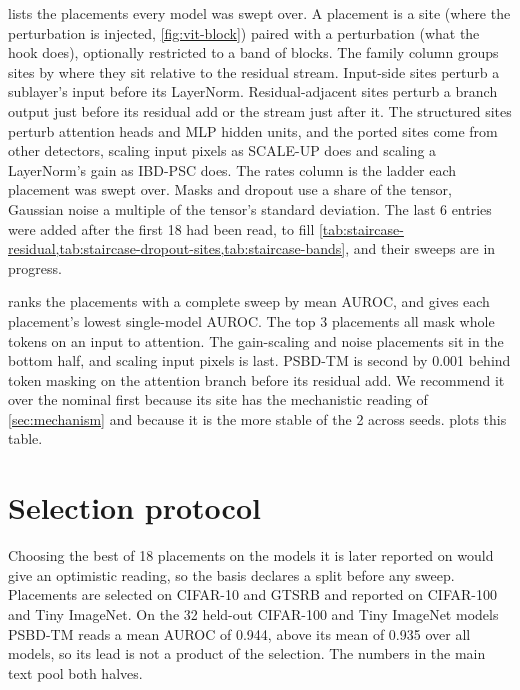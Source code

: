  lists the placements every model was swept over. A placement is a site (where the perturbation is injected, \cref{fig:vit-block}) paired with a perturbation (what the hook does), optionally restricted to a band of blocks. The family column groups sites by where they sit relative to the residual stream. Input-side sites perturb a sublayer's input before its LayerNorm. Residual-adjacent sites perturb a branch output just before its residual add or the stream just after it. The structured sites perturb attention heads and MLP hidden units, and the ported sites come from other detectors, scaling input pixels as SCALE-UP does and scaling a LayerNorm's gain as IBD-PSC does. The rates column is the ladder each placement was swept over. Masks and dropout use a share of the tensor, Gaussian noise a multiple of the tensor's standard deviation. The last 6 entries were added after the first 18 had been read, to fill \cref{tab:staircase-residual,tab:staircase-dropout-sites,tab:staircase-bands}, and their sweeps are in progress.


\FloatBarrier

 ranks the placements with a complete sweep by mean AUROC, and gives each placement's lowest single-model AUROC. The top 3 placements all mask whole tokens on an input to attention. The gain-scaling and noise placements sit in the bottom half, and scaling input pixels is last. PSBD-TM is second by 0.001 behind token masking on the attention branch before its residual add. We recommend it over the nominal first because its site has the mechanistic reading of \cref{sec:mechanism} and because it is the more stable of the 2 across seeds.  plots this table.


\FloatBarrier

\section{Selection protocol}
\label{app:protocol}

Choosing the best of 18 placements on the models it is later reported on would give an optimistic reading, so the basis declares a split before any sweep. Placements are selected on CIFAR-10 and GTSRB and reported on CIFAR-100 and Tiny ImageNet. On the 32 held-out CIFAR-100 and Tiny ImageNet models PSBD-TM reads a mean AUROC of 0.944, above its mean of 0.935 over all models, so its lead is not a product of the selection. The numbers in the main text pool both halves.

